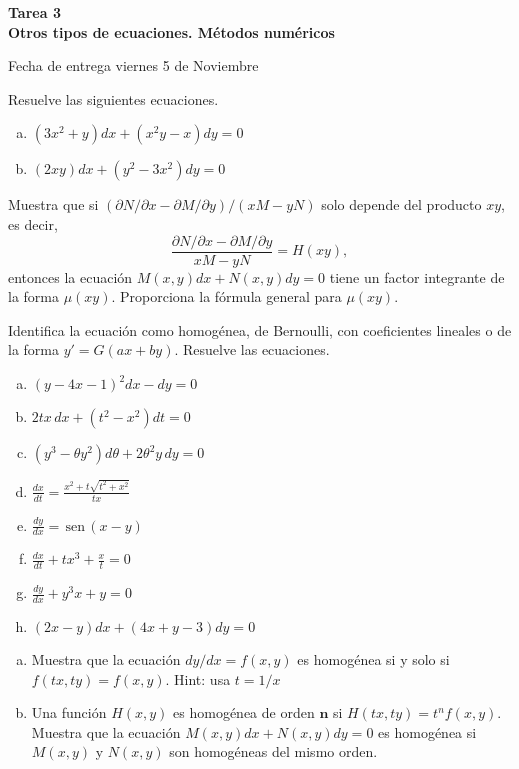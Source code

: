 \documentclass[12pt]{exam}
\renewcommand{\sin}{\,\text{sen}\,}
\begin{document}
\centering


\Large 
\textbf{\huge Tarea 3\\ \large Otros tipos de ecuaciones. Métodos numéricos}

\small
Fecha de entrega viernes 5 de Noviembre
\vskip10pt

\normalsize

\pointformat{\bfseries\boldmath(\thepoints)}
\vskip10pt

    
    \begin{questions}
     \question
     Resuelve las siguientes ecuaciones.
     \begin{enumerate} [a)]
			\item $(3x^2+y)dx+(x^2y-x)dy=0$
		  	\item $(2xy)dx+(y^2-3x^2)dy=0$
     \end{enumerate}

     
     \question
     Muestra que si $(\partial N/\partial x-\partial M/\partial y)/(xM-yN)$ solo depende del producto $xy$, es decir, $$\frac{\partial N/\partial x-\partial M/\partial y}{xM-yN}=H(xy),$$ entonces la ecuación $M(x,y)dx+N(x,y)dy=0$ tiene un factor integrante de la forma $\mu(xy)$. Proporciona la fórmula general para $\mu(xy)$.
     
     \question
     Identifica la ecuación como homogénea, de Bernoulli, con coeficientes lineales o de la forma $y'=G(ax+by)$. Resuelve las ecuaciones.
     \begin{enumerate}[a)]
     	\item $(y-4x-1)^2dx-dy=0$
        \item $2tx\,dx+(t^2-x^2)dt=0$
        \item $(y^3-\theta y^2)d\theta+2\theta^2y\,dy=0$
        \item $\frac{dx}{dt}=\frac{x^2+t\sqrt{t^2+x^2}}{tx}$
        \item $\frac{dy}{dx}= \sin(x-y)$
        \item $\frac{dx}{dt}+tx^3+\frac{x}{t}=0$
        \item $\frac{dy}{dx}+y^3x+y=0$
        \item $(2x-y)dx+(4x+y-3)dy=0$
       \end{enumerate}
        
     \question
     \begin{enumerate}[a)]
     		\item Muestra que la ecuación $dy/dx=f(x,y)$ es homogénea si y solo si $f(tx,ty)=f(x,y)$. Hint: usa $t=1/x$
            \item Una función $H(x,y)$ es homogénea de orden $\mathbf{n}$ si $H(tx,ty)=t^nf(x,y)$. Muestra que la ecuación $M(x,y)dx+N(x,y)dy=0$ es homogénea si $M(x,y)$ y $N(x,y)$ son homogéneas del mismo orden.
     \end{enumerate}
     


\end{questions}
\end{document}
